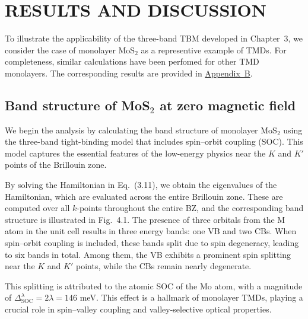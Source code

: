 \chapter{\textbf{RESULTS AND DISCUSSION}}
To illustrate the applicability of the three-band \ac{TBM} developed in Chapter~3, we consider the case of monolayer MoS$_{2}$ as a representive example of \acp{TMD}. For completeness, similar calculations have been perfomed for other \ac{TMD} monolayers. The corresponding results are provided in \hyperref[appendix B]{Appendix~B}.
\section{Band structure of MoS$_{2}$ at zero magnetic field}
We begin the analysis by calculating the band structure of monolayer MoS$_2$ using the three-band tight-binding model that includes spin–orbit coupling (SOC). This model captures the essential features of the low-energy physics near the $K$ and $K'$ points of the Brillouin zone.

By solving the Hamiltonian in Eq.~(3.11), we obtain the eigenvalues of the Hamiltonian, which are evaluated across the entire Brillouin zone. These are computed over all $k$-points throughout the entire \ac{BZ}, and the corresponding band structure is illustrated in Fig.~4.1. The presence of three orbitals from the M atom in the unit cell results in three energy bands: one \ac{VB} and two \acp{CB}. When spin–orbit coupling is included, these bands split due to spin degeneracy, leading to six bands in total. Among them, the \ac{VB} exhibits a prominent spin splitting near the $K$ and $K'$ points, while the \acp{CB} remain nearly degenerate.



This splitting is attributed to the atomic \ac{SOC} of the Mo atom, with a magnitude of $\Delta_{\text{SOC}}^{\lambda} = 2\lambda = 146$ meV. This effect is a hallmark of monolayer \acp{TMD}, playing a crucial role in spin–valley coupling and valley-selective optical properties.


